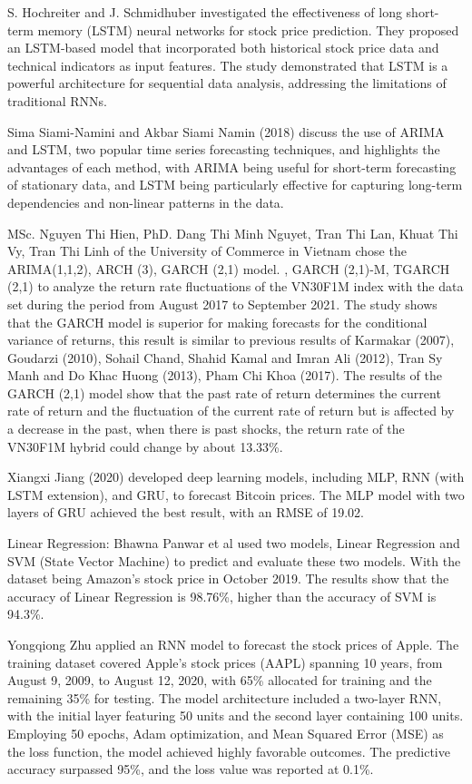\documentclass{ieeeojies}
\begin{document}
S. Hochreiter and J. Schmidhuber \cite{b2} investigated the effectiveness of long short-term memory (LSTM) neural networks for stock price prediction. They proposed an LSTM-based model that incorporated both historical stock price data and technical indicators as input features. The study demonstrated that LSTM is a powerful architecture for sequential data analysis, addressing the limitations of traditional RNNs. 

Sima Siami-Namini and Akbar Siami Namin (2018) \cite{b3} discuss the use of ARIMA and LSTM, two popular time series forecasting techniques, and highlights the advantages of each method, with ARIMA being useful for short-term forecasting of stationary data, and LSTM being particularly effective for capturing long-term dependencies and non-linear patterns in the data.

MSc. Nguyen Thi Hien, PhD. Dang Thi Minh Nguyet, Tran Thi Lan, Khuat Thi Vy, Tran Thi Linh of the University of Commerce in Vietnam chose the ARIMA(1,1,2), ARCH (3), GARCH (2,1) model. , GARCH (2,1)-M, TGARCH (2,1) to analyze the return rate fluctuations of the VN30F1M index with the data set during the period from August 2017 to September 2021. The study shows that the GARCH model is superior for making forecasts for the conditional variance of returns, this result is similar to previous results of Karmakar (2007), Goudarzi (2010), Sohail Chand, Shahid Kamal and Imran Ali (2012), Tran Sy Manh and Do Khac Huong (2013), Pham Chi Khoa (2017). The results of the GARCH (2,1) model show that the past rate of return determines the current rate of return and the fluctuation of the current rate of return but is affected by a decrease in the past, when there is past shocks, the return rate of the VN30F1M hybrid could change by about 13.33\%. \cite{b4}


Xiangxi Jiang (2020) \cite{b5} developed deep learning models, including MLP, RNN (with LSTM extension), and GRU, to forecast Bitcoin prices. The MLP model with two layers of GRU achieved the best result, with an RMSE of 19.02.

Linear Regression: Bhawna Panwar et al used two models, Linear Regression and SVM (State Vector Machine) to predict and evaluate these two models. With the dataset being Amazon’s stock price in October 2019. The results show that the accuracy of Linear Regression is 98.76{\%}, higher than the accuracy of SVM is 94.3{\%}. \cite{b6}

Yongqiong Zhu \cite{b7} applied an RNN model to forecast the stock prices of Apple. The training dataset covered Apple’s stock prices (AAPL) spanning 10 years, from August 9, 2009, to August 12, 2020, with 65{\%} allocated for training and the remaining 35{\%} for testing. The model architecture included a two-layer RNN, with the initial layer featuring 50 units and the second layer containing 100 units. Employing 50 epochs, Adam optimization, and Mean Squared Error (MSE) as the loss function, the model achieved highly favorable outcomes. The predictive accuracy surpassed 95{\%}, and the loss value was reported at 0.1{\%}.
\end{document}
